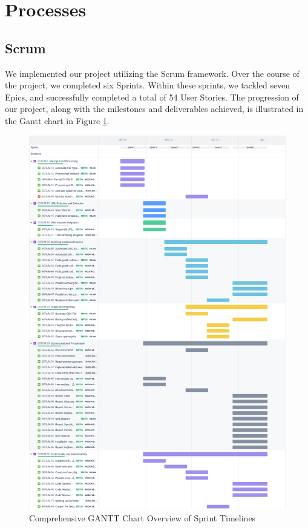 \section{Processes}

\subsection{Scrum}
We implemented our project utilizing the Scrum framework.
Over the course of the project, we completed six \glspl{Sprint}.
Within these sprints, we tackled seven \glspl{Epic}, and successfully completed a total of 54 User Stories.
The progression of our project, along with the milestones and deliverables achieved, is illustrated in the Gantt chart in Figure \ref{fig:scrum_gantt}.

\begin{figure}[h!]
	\center
	\includegraphics[width=1\textwidth]{pictures/Scrum/GANTT.png}
	\caption{Comprehensive GANTT Chart Overview of Sprint Timelines}
	\label{fig:scrum_gantt}
\end{figure}

